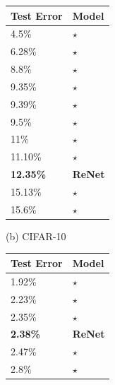 \begin{table}[t]
\begin{minipage}{0.45\textwidth}
            \begin{tabular}{l |  l}
                Test Error & Model  \\
                \hline
    4.5\% & \citep{DBLP:journals/corr/Graham14a}$\star$ \\
    6.28\% & \citep{DBLP:journals/corr/Graham14}$\star$ \\
    8.8\% & \citep{Lin2014}$\star$ \\
    9.35\% & \citep{Goodfellow2013}$\star$ \\
    9.39\% & \citep{DBLP:journals/corr/SpringenbergR13}$\star$ \\
    9.5\% & \citep{DBLP:conf/nips/SnoekLA12}$\star$ \\
    11\% & \citep{Krizhevsky-2012}$\star$ \\
    11.10\% & \citep{DBLP:conf/icml/WanZZLF13}$\star$ \\
    \bf{12.35\%} & \bf{ReNet} \\
    15.13\% & \citep{DBLP:journals/corr/abs-1301-3557}$\star$ \\
    15.6\% & \citep{DBLP:journals/corr/abs-1207-0580}$\star$ \\
            \end{tabular}

            \vspace{2mm}
            (b) CIFAR-10
        \end{minipage}

        \vspace{4mm}
        \begin{minipage}{0.45\textwidth}
            \centering
            \begin{tabular}{l |  l}
                Test Error & Model  \\
                \hline
    1.92\% & \citep{DBLP:journals/corr/LeeXGZT14}$\star$ \\
    2.23\% & \citep{DBLP:conf/icml/WanZZLF13}$\star$ \\
    2.35\% & \citep{Lin2014}$\star$ \\
    \bf{2.38\%} & \bf{ReNet} \\
    2.47\% & \citep{Goodfellow2013}$\star$ \\
    2.8\% & \citep{DBLP:journals/corr/abs-1301-3557}$\star$ \\
            \end{tabular}


\end{minipage}
\end{table}
